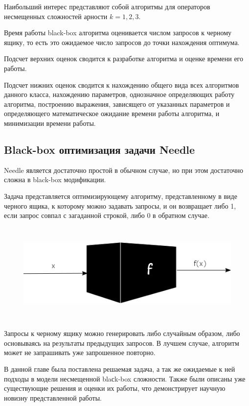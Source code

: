 Наибольший интерес представляют собой алгоритмы для операторов  несмещенных сложностей арности $k = 1, 2, 3$.

Время работы black-box алгоритма оценивается числом запросов к черному ящику,  то есть это ожидаемое число запросов до точки  нахождения оптимума.
	
Подсчет верхних оценок сводится к разработке алгоритма и оценке времени его работы.
	
Подсчет нижних оценок сводится к нахождению общего вида всех алгоритмов данного класса, нахождению параметров, однозначное определяющих работу алгоритма, построению выражения, 
зависящего от указанных параметров и определяющего математическое ожидание времени работы алгоритма, и минимизации времени работы.  

\subsection{Black-box оптимизация задачи Needle}

Needle является достаточно простой в обычном случае, но при этом достаточно сложна в black-box модификации.

Задача представляется оптимизирующему алгоритму, представленному в виде черного ящика, к которому можно задавать запросы, и он возвращает либо 1, если запрос совпал с загаданной строкой, 
либо 0 в обратном случае. 

\begin{figure}[H]
\caption{}\label{fig3}
    \includegraphics[height=5cm]{pic/blackbox.png}
\end{figure}

Запросы к черному ящику можно генерировать либо случайным образом, либо основываясь на результаты предыдущих запросов. В лучшем случае, алгоритм может не запрашивать уже запрошенное повторно.

\chapterconclusion

В данной главе была поставлена решаемая задача, а так же ожидаемые к ней подходы в модели несмещенной blaсk-box сложности. Также были описаны уже существующие решения и оценки их работы, что 
демонстрирует научную новизну представленной работы. 
